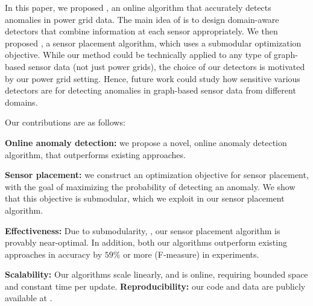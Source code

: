 In this paper, we proposed \methodD, an online algorithm that accurately detects anomalies in power grid data. The main idea of \methodD is to design domain-aware detectors that combine information at each sensor appropriately. We then proposed \method, a sensor placement algorithm, which uses a submodular optimization objective. While our method could be technically applied to any type of graph-based sensor data (not just power grids), the choice of our detectors is motivated by our power grid setting. Hence, future work could study how sensitive various detectors are for detecting anomalies in graph-based sensor data from different domains.

Our contributions are as follows:
\ben
\item {\bf Online anomaly detection:} we propose a novel, online anomaly detection algorithm, \methodD that outperforms existing approaches.
\item {\bf Sensor placement:} we construct an optimization objective for sensor placement, with the goal of maximizing the probability of detecting an anomaly. We show that this objective is submodular, which we exploit in our sensor placement algorithm.
\item {\bf Effectiveness:} Due to submodularity, \method, our sensor placement algorithm is provably near-optimal. In addition, both our algorithms outperform existing approaches in accuracy by $59\%$ or more (F-measure) in experiments. 
\item {\bf Scalability:} Our algorithms scale linearly, and \methodD is online, requiring bounded space and constant time per update. 
\een
\textbf{Reproducibility:} our code and data are publicly available at \codeurl.

